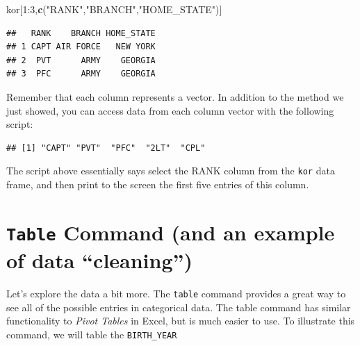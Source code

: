 \documentclass[]{book}
\newenvironment{Shaded}{\begin{snugshade}}{\end{snugshade}}
\newcommand{\KeywordTok}[1]{\textcolor[rgb]{0.13,0.29,0.53}{\textbf{{#1}}}}
\newcommand{\DecValTok}[1]{\textcolor[rgb]{0.00,0.00,0.81}{{#1}}}
\newcommand{\StringTok}[1]{\textcolor[rgb]{0.31,0.60,0.02}{{#1}}}
\newcommand{\NormalTok}[1]{{#1}}
\begin{document}
\begin{Shaded}
\begin{Highlighting}[]
\NormalTok{kor[}\DecValTok{1}\NormalTok{:}\DecValTok{3}\NormalTok{,}\KeywordTok{c}\NormalTok{(}\StringTok{"RANK"}\NormalTok{,}\StringTok{"BRANCH"}\NormalTok{,}\StringTok{"HOME_STATE"}\NormalTok{)]}
\end{Highlighting}
\end{Shaded}

\begin{verbatim}
##   RANK    BRANCH HOME_STATE
## 1 CAPT AIR FORCE   NEW YORK
## 2  PVT      ARMY    GEORGIA
## 3  PFC      ARMY    GEORGIA
\end{verbatim}

Remember that each column represents a vector. In addition to the method
we just showed, you can access data from each column vector with the
following script:

\begin{Shaded}
\end{Shaded}

\begin{verbatim}
## [1] "CAPT" "PVT"  "PFC"  "2LT"  "CPL"
\end{verbatim}

The script above essentially says select the RANK column from the
\texttt{kor} data frame, and then print to the screen the first five
entries of this column.

\section{\texorpdfstring{\texttt{Table} Command (and an example of data
``cleaning'')}{Table Command (and an example of data cleaning)}}\label{table-command-and-an-example-of-data-cleaning}

Let's explore the data a bit more. The \texttt{table} command provides a
great way to see all of the possible entries in categorical data. The
table command has similar functionality to \emph{Pivot Tables} in Excel,
but is much easier to use. To illustrate this command, we will table the
\texttt{BIRTH\_YEAR}

\begin{Shaded}
\end{Shaded}
\end{document}
